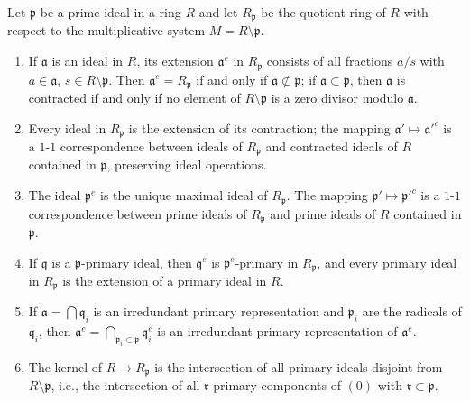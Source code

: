 Let $\mathfrak{p}$ be a prime ideal in a ring $R$ and let $R_{\mathfrak{p}}$ be the quotient ring of $R$ with respect to the multiplicative system $M = R \setminus \mathfrak{p}$.

\begin{enumerate}
\item[(a)] If $\mathfrak{a}$ is an ideal in $R$, its extension $\mathfrak{a}^e$ in $R_{\mathfrak{p}}$ consists of all fractions $a/s$ with $a \in \mathfrak{a}$, $s \in R \setminus \mathfrak{p}$. Then $\mathfrak{a}^e = R_{\mathfrak{p}}$ if and only if $\mathfrak{a} \not\subset \mathfrak{p}$; if $\mathfrak{a} \subset \mathfrak{p}$, then $\mathfrak{a}$ is contracted if and only if no element of $R \setminus \mathfrak{p}$ is a zero divisor modulo $\mathfrak{a}$.

\item[(b)] Every ideal in $R_{\mathfrak{p}}$ is the extension of its contraction; the mapping $\mathfrak{a}' \mapsto \mathfrak{a}'^{c}$ is a $1$-$1$ correspondence between ideals of $R_{\mathfrak{p}}$ and contracted ideals of $R$ contained in $\mathfrak{p}$, preserving ideal operations.

\item[(c)] The ideal $\mathfrak{p}^e$ is the unique maximal ideal of $R_{\mathfrak{p}}$. The mapping $\mathfrak{p}' \mapsto \mathfrak{p}'^{c}$ is a $1$-$1$ correspondence between prime ideals of $R_{\mathfrak{p}}$ and prime ideals of $R$ contained in $\mathfrak{p}$.

\item[(d)] If $\mathfrak{q}$ is a $\mathfrak{p}$-primary ideal, then $\mathfrak{q}^e$ is $\mathfrak{p}^e$-primary in $R_{\mathfrak{p}}$, and every primary ideal in $R_{\mathfrak{p}}$ is the extension of a primary ideal in $R$.

\item[(e)] If $\mathfrak{a} = \bigcap \mathfrak{q}_i$ is an irredundant primary representation and $\mathfrak{p}_i$ are the radicals of $\mathfrak{q}_i$, then $\mathfrak{a}^e = \bigcap_{\mathfrak{p}_i \subset \mathfrak{p}} \mathfrak{q}_i^e$ is an irredundant primary representation of $\mathfrak{a}^e$.

\item[(f)] The kernel of $R \to R_{\mathfrak{p}}$ is the intersection of all primary ideals disjoint from $R \setminus \mathfrak{p}$, i.e., the intersection of all $\mathfrak{r}$-primary components of $(0)$ with $\mathfrak{r} \subset \mathfrak{p}$.
\end{enumerate}
